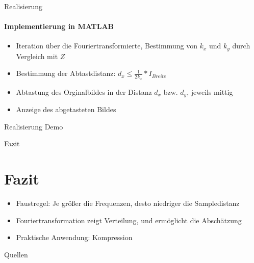 \documentclass{beamer}
\begin{document}
	\begin{frame}{Realisierung}
	\framesubtitle{Implementierung in MATLAB}
	\begin{itemize}
	\item Iteration über die Fouriertransformierte, Bestimmung von $k_x$ und $k_y$ durch Vergleich mit $Z$
	\item Bestimmung der Abtastdistanz: $d_x\leq \frac{1}{2k_x}*I_{Breite}$
	\item Abtastung des Orginalbildes in der Distanz $d_x$ bzw. $d_y$, jeweils mittig
	\item Anzeige des abgetasteten Bildes
	\end{itemize}

	\end{frame}
	\begin{frame}{Realisierung}
	Demo
	\end{frame}
	\begin{frame}{Fazit}
	\section{Fazit}
	\begin{itemize}
		\item Faustregel: Je größer die Frequenzen, desto niedriger die Sampledistanz
		\item Fouriertransformation zeigt Verteilung, und ermöglicht die Abschätzung
		\item Praktische Anwendung: Kompression
	\end{itemize}
	\end{frame}
	
	\begin{frame}{Quellen}
		\begin{multicols}{2}
		\tiny{
			
			
		}
		\end{multicols}
	\end{frame}
	
\end{document}

